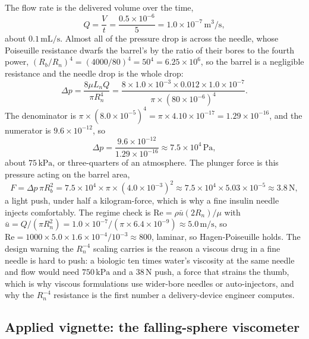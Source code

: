 The flow rate is the delivered volume over the time,
\[
Q = \frac{V}{t} = \frac{0.5\times10^{-6}}{5} = 1.0\times10^{-7}\,\si{
\meter\cubed\per\second},
\]
about $0.1\,\text{mL/s}$. Almost all of the pressure drop is across the
needle, whose Poiseuille resistance dwarfs the barrel's by the ratio of
their bores to the fourth power, $(R_b/R_n)^4 = (4000/80)^4 = 50^4 =
6.25\times10^{6}$, so the barrel is a negligible resistance and the
needle drop is the whole drop:
\[
\Delta p = \frac{8\mu L_n Q}{\pi R_n^4} = \frac{8\times1.0\times10^{-3}
\times0.012\times1.0\times10^{-7}}{\pi\times(80\times10^{-6})^4}.
\]
The denominator is $\pi\times(8.0\times10^{-5})^4 = \pi\times4.10\times
10^{-17} = 1.29\times10^{-16}$, and the numerator is $9.6\times10^{-12}$,
so
\[
\Delta p = \frac{9.6\times10^{-12}}{1.29\times10^{-16}} \approx 7.5\times
10^{4}\,\si{\pascal},
\]
about $75\,\text{kPa}$, or three-quarters of an atmosphere. The plunger
force is this pressure acting on the barrel area,
\[
F = \Delta p\,\pi R_b^2 = 7.5\times10^{4}\times\pi\times(4.0\times10^{-3})
^2 \approx 7.5\times10^{4}\times5.03\times10^{-5} \approx 3.8\,\si{
\newton},
\]
a light push, under half a kilogram-force, which is why a fine insulin
needle injects comfortably. The regime check is $\text{Re} = \rho\bar u
(2R_n)/\mu$ with $\bar u = Q/(\pi R_n^2) = 1.0\times10^{-7}/(\pi\times
6.4\times10^{-9}) \approx 5.0\,\si{\meter\per\second}$, so $\text{Re} =
1000\times5.0\times1.6\times10^{-4}/10^{-3} \approx 800$, laminar, so
Hagen-Poiseuille holds. The design warning the $R_n^{-4}$ scaling
carries is the reason a viscous drug in a fine needle is hard to push: a
biologic ten times water's viscosity at the same needle and flow would
need $750\,\text{kPa}$ and a $38\,\si{\newton}$ push, a force that
strains the thumb, which is why viscous formulations use wider-bore
needles or auto-injectors, and why the $R_n^{-4}$ resistance is the first
number a delivery-device engineer computes.



\subsection*{Applied vignette: the falling-sphere viscometer}

